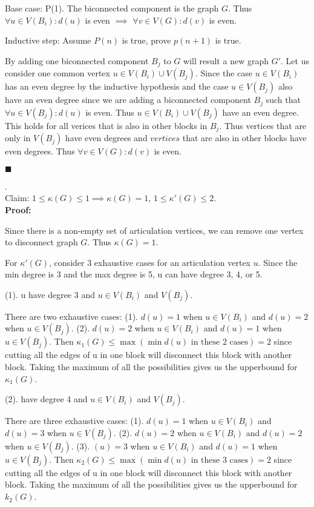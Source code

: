 \documentclass[12pt]{article}
\begin{document}
	Base case: P(1). The biconnected component is the graph $G$. Thus $\forall u\in V(B_i) : d(u)$ is even $\implies$ $\forall v\in V(G) : d(v)$ is even.
	
	Inductive step: Assume $P(n)$ is true, prove $p(n+1)$ is true.
	
	By adding one biconnected component $B_j$ to $G$ will result a new graph $G'$. 
	Let us consider one common vertex $u \in V(B_i) \cup V(B_j)$. Since the case $u \in V(B_i)$ has an even degree by the inductive hypothesis and the case $u \in V(B_j)$ also have an even degree since we are adding a biconnected component $B_j$ such that  $\forall u\in V(B_j) : d(u)$ is even. Thus $u \in V(B_i) \cup V(B_j)$ have an even degree. This holds for all verices that is also in other blocks in $B_j$. Thus vertices that are only in $V(B_j)$ have even degrees and $vertices$ that are also in other blocks have even degrees. Thus $\forall v\in V(G) : d(v)$ is even.
	
	\hfill $\blacksquare$ 
	\newpage
	
	.\\
	Claim: $1 \leq \kappa(G) \leq 1 \implies \kappa(G) = 1$, $1 \leq \kappa'(G) \leq 2$.\\
	\textbf{Proof:}
	
	Since there is a non-empty set of articulation vertices, we can remove one vertex to disconnect graph $G$. Thus $\kappa(G) = 1$.
	
	For $\kappa'(G)$, consider 3 exhaustive cases for an articulation vertex $u$. Since the min degree is 3 and the max degree is 5, u can have degree 3, 4, or 5.
	
	(1). u have degree 3 and $u \in V(B_i)$ and $V(B_j)$.
	
	There are two exhaustive cases: (1). $d(u) = 1$ when $u \in V(B_i)$ and $d(u) = 2$ when $u \in V(B_j)$. (2). $d(u) = 2$ when $u \in V(B_i)$ and $d(u) = 1$ when $u \in V(B_j)$. Then $\kappa_1(G) \leq \max (\min d(u) \text{ in these 2 cases}) = 2$ since cutting all the edges of u in one block will disconnect this block with another block. Taking the maximum of all the possibilities gives us the upperbound for $\kappa_1(G)$.
	
	(2). have degree 4 and $u \in V(B_i)$ and $V(B_j)$.
	
	There are three exhaustive cases: (1). $d(u) = 1$ when $u \in V(B_i)$ and $d(u) = 3$ when $u \in V(B_j)$. (2). $d(u) = 2$ when $u \in V(B_i)$ and $d(u) = 2$ when $u \in V(B_j)$. (3). $(u) = 3$ when $u \in V(B_i)$ and $d(u) = 1$ when $u \in V(B_j)$. Then $\kappa_2(G) \leq \max (\min d(u) \text{ in these 3 cases}) = 2$ since cutting all the edges of u in one block will disconnect this block with another block. Taking the maximum of all the possibilities gives us the upperbound for $k_2(G)$.
	
\end{document}
